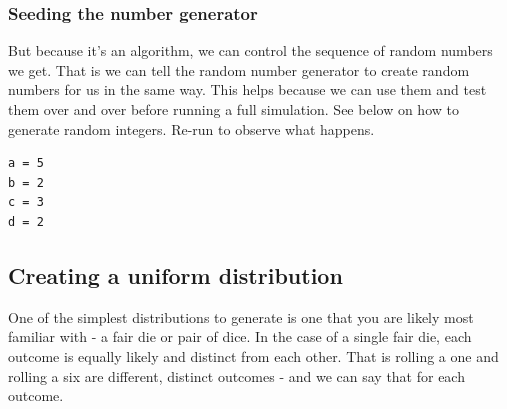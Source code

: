 \subsubsection{Seeding the number
generator}\label{seeding-the-number-generator}

But because it's an algorithm, we can control the sequence of random
numbers we get. That is we can tell the random number generator to
create random numbers for us in the same way. This helps because we can
use them and test them over and over before running a full simulation.
See below on how to generate random integers. Re-run to observe what
happens.

\begin{Shaded}
\begin{Highlighting}[]
\OperatorTok{=} 
\OperatorTok{=} 

\OperatorTok{=}
\NormalTok{(}
\NormalTok{)}
\OperatorTok{=}
\NormalTok{(}
\NormalTok{)}
\OperatorTok{=}
\NormalTok{(}
\NormalTok{)}
\OperatorTok{=}
\NormalTok{(}
\end{Highlighting}
\end{Shaded}

\begin{verbatim}
a = 5
b = 2
c = 3
d = 2
\end{verbatim}

\subsection{Creating a uniform
distribution}\label{creating-a-uniform-distribution}

One of the simplest distributions to generate is one that you are likely
most familiar with - a fair die or pair of dice. In the case of a single
fair die, each outcome is equally likely and distinct from each other.
That is rolling a one and rolling a six are different, distinct outcomes
- and we can say that for each outcome.

